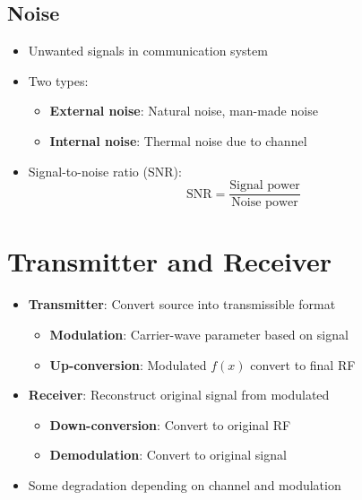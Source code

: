 \documentclass[conference]{IEEEtran}
\begin{document}
\subsection{Noise}

\begin{itemize}
    \item Unwanted signals in communication system 
    
    \item Two types: 
    \begin{itemize}
        \item \textbf{External noise}: Natural noise, man-made noise
        \item \textbf{Internal noise}: Thermal noise due to channel
    \end{itemize}

    \item Signal-to-noise ratio (SNR): 
    $$
        \text{SNR} = \frac{\text{Signal power}}{\text{Noise power}}
    $$
\end{itemize}

\section{\textbf{Transmitter and Receiver}}

\begin{itemize}
    \item \textbf{Transmitter}: Convert source into transmissible format
    \begin{itemize}
        \item \textbf{Modulation}: Carrier-wave parameter based on signal
        \item \textbf{Up-conversion}: Modulated $f(x)$ convert to final RF
    \end{itemize}

    \item \textbf{Receiver}: Reconstruct original signal from modulated 
    \begin{itemize}
        \item \textbf{Down-conversion}: Convert to original RF
        \item \textbf{Demodulation}: Convert to original signal 
    \end{itemize}

    \item Some degradation depending on channel and modulation
\end{itemize}
\end{document}
